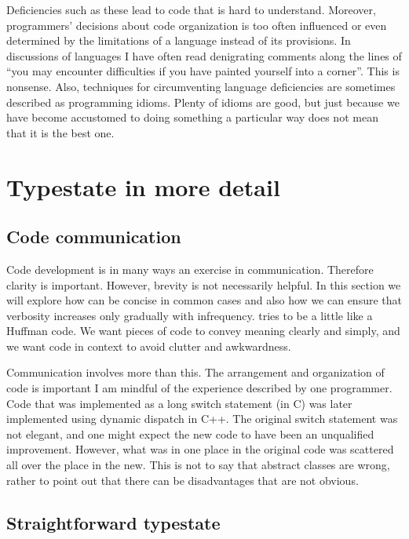 \documentclass[10pt]{amsart}
\begin{document}
Deficiencies such as these lead to code that is hard to understand.
Moreover, programmers' decisions about code organization is too often
influenced or even determined by the limitations of a language instead
of its provisions.  In discussions of languages I have often read
denigrating comments along the lines of ``you may encounter
difficulties if you have painted yourself into a corner''.  This is
nonsense.  Also, techniques for circumventing language deficiencies
are sometimes described as programming idioms.  Plenty of idioms are
good, but just because we have become accustomed to doing something a
particular way does not mean that it is the best one.


\section{Typestate in more detail}

\subsection{Code communication}

Code development is in many ways an exercise in communication.
Therefore clarity is important.  However, brevity is not necessarily
helpful.  In this section we will explore how \Utop can be concise in
common cases and also how we can ensure that verbosity increases only
gradually with infrequency.  \Utop tries to be a little like a Huffman
code.  We want pieces of code to convey meaning clearly and simply,
and we want code in context to avoid clutter and awkwardness.

Communication involves more than this.  The arrangement and
organization of code is important I am mindful of the experience
described by one programmer.  Code that was implemented as a long
switch statement (in C) was later implemented using dynamic dispatch
in C++\@.  The original switch statement was not elegant, and one
might expect the new code to have been an unqualified improvement.
However, what was in one place in the original code was scattered all
over the place in the new.  This is not to say that abstract classes
are wrong, rather to point out that there can be disadvantages that
are not obvious.


\subsection{Straightforward typestate}
\end{document}

